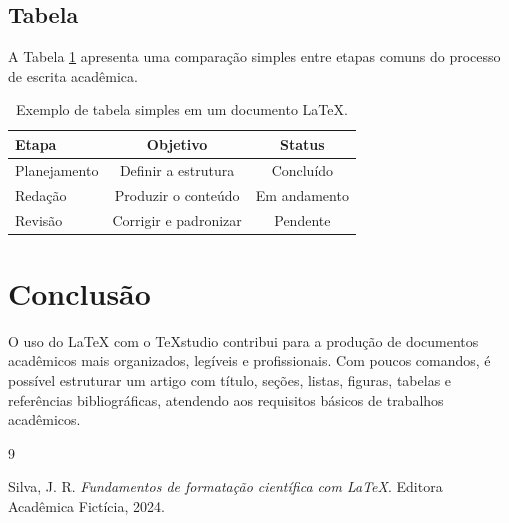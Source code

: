 \documentclass[12pt,a4paper]{article}
\begin{document}
\subsection*{Tabela}

A Tabela \ref{tab:comparacao} apresenta uma comparação simples entre etapas
comuns do processo de escrita acadêmica.

\begin{table}[htbp]
    \centering
    \begin{tabular}{|l|c|c|}
        \hline
        \textbf{Etapa} & \textbf{Objetivo} & \textbf{Status} \\
        \hline
        Planejamento & Definir a estrutura & Concluído \\
        \hline
        Redação & Produzir o conteúdo & Em andamento \\
        \hline
        Revisão & Corrigir e padronizar & Pendente \\
        \hline
    \end{tabular}
    \caption{Exemplo de tabela simples em um documento \LaTeX{}.}
    \label{tab:comparacao}
\end{table}

\section{Conclusão}

O uso do \LaTeX{} com o TeXstudio contribui para a produção de documentos
acadêmicos mais organizados, legíveis e profissionais. Com poucos comandos, é
possível estruturar um artigo com título, seções, listas, figuras, tabelas e
referências bibliográficas, atendendo aos requisitos básicos de trabalhos
acadêmicos.

\begin{thebibliography}{9}

Silva, J. R.
\textit{Fundamentos de formatação científica com \LaTeX{}}.
Editora Acadêmica Fictícia, 2024.

\end{thebibliography}
\end{document}
